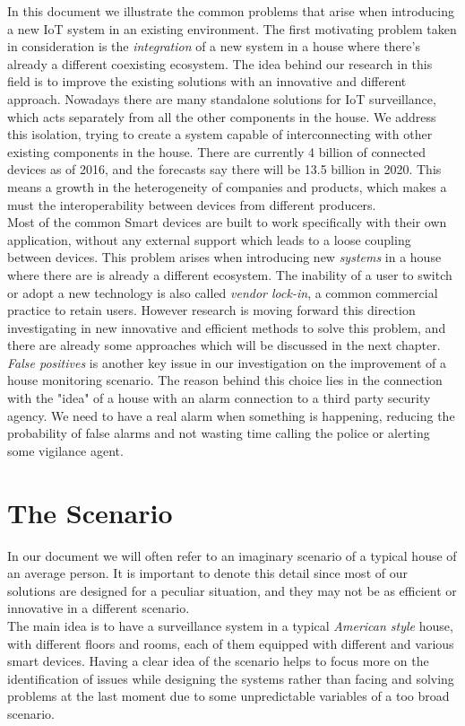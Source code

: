 In this document we illustrate the common problems that arise
when introducing a new IoT system in an existing environment.
The first motivating problem taken in consideration is the \textit{integration} of a new
system in a house where there's already a different coexisting ecosystem.
The idea behind our research in this field is to improve the existing solutions
with an innovative and different approach. Nowadays there are many standalone
solutions for IoT surveillance, which acts separately from all the other
components in the house. We address this isolation, trying to create
a system capable of interconnecting with other existing components in the house.
There are currently 4 billion of connected devices \cite{gartner} as of 2016, and the forecasts
say there will be 13.5 billion in 2020. This means a growth in the heterogeneity of companies
and products, which makes a must the interoperability between devices from different
producers.\\
Most of the common Smart devices are built to work specifically with their own application,
without any external support which leads to a loose coupling between devices. This problem
arises when introducing new \textit{systems} in a house where there are is already a different
ecosystem. The inability of a user to switch or adopt a new technology is also called \textit{vendor lock-in},
a common commercial practice to retain users. However research is moving forward
this direction investigating in new innovative and efficient methods to solve this
problem, and there are already some approaches which will be discussed in the next chapter.
\textit{False positives} is another key issue in our investigation on the improvement of a
house monitoring scenario. The reason behind this choice lies in the connection with the "idea"
of a house with an alarm connection to a third party security agency. We need to have a real
alarm when something is happening, reducing the probability of false alarms and not wasting time
calling the police or alerting some vigilance agent.


\section{The Scenario}

In our document we will often refer to an imaginary scenario of a typical house
of an average person. It is important to denote this detail since most of our
solutions are designed for a peculiar situation, and they may not be as
efficient or innovative in a different scenario.\\
The main idea is to have a surveillance system in a typical \textit{American style}
house, with different floors and rooms, each of them equipped with different
and various smart devices. Having a clear idea of the scenario helps to focus more
on the identification of issues while designing the systems rather than facing
and solving problems at the last moment due to some unpredictable variables of a
too broad scenario.


